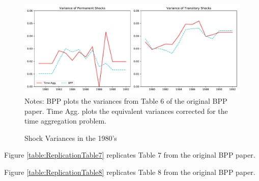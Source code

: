 \documentclass[titlepage]{\econtex}\newcommand{\texname}{BPP_PSID_TimeAgg}
\begin{document}
\begin{figure}
	\caption{Shock Variances in the 1980's}
	\label{shockVariance}
	\includegraphics[width=1\textwidth]{Code/Figures/ShockVariances1980s.pdf}
	\footnotesize Notes: BPP plots the variances from Table 6 of the original BPP paper. Time Agg. plots the equivalent variances corrected for the time aggregation problem.
\end{figure}

Figure \ref{table:ReplicationTable7} replicates Table 7 from the original BPP paper.



Figure \ref{table:ReplicationTable8} replicates Table 8 from the original BPP paper.



\processdelayedfloats


%

\pagebreak\appendix

\end{document}
